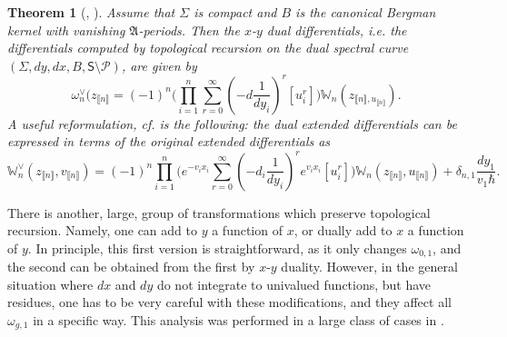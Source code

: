 \documentclass[10pt,a4paper,oneside,no-math,reqno]{amsart}%
\theoremstyle{plain}
\newtheorem{theorem}{Theorem}[section]
\theoremstyle{definition}
\theoremstyle{remark}
\numberwithin{equation}{section}
\newcommand{\mb}[1]{\mathbb{#1}}
\newcommand{\mf}[1]{\mathfrak{#1}}
\newcommand{\mc}[1]{\mathcal{#1}}
\newcommand{\1}{\mathds{1}}
\newcommand{\<}{\langle}
\renewcommand{\>}{\rangle}
\begin{document}
\begin{theorem}[{\cite[Theorem 1.14]{ABDKS25universal}, \cite[Theorem 3.6]{ABDKS25}}]\label{Thmx-y}
    Assume that $ \Sigma $ is compact and $ B $ is the canonical Bergman kernel with vanishing $ \mf{A}$-periods. Then the \emph{$ x$-$y$ dual differentials}, i.e. the differentials computed by topological recursion on the \emph{dual} spectral curve $ (\Sigma, dy, dx, B, \mathsf{S} \setminus \mc{P})$, are given by
    \begin{equation}\label{NonExtendedx-y}
        \omega^\vee_{n} (z_{\llbracket n \rrbracket}
        =
        (-1)^n \Bigg( \prod_{i=1}^n \sum_{r = 0}^\infty ( - d\frac{1}{dy_i})^r [u_i^r] \Bigg) \mb{W}_n (z_{\llbracket n \rrbracket, u_{\llbracket n \rrbracket }}).
    \end{equation}
    A useful reformulation, cf. \cite[Theorem 3.10.3]{ABDKS24} is the following: the dual extended differentials can be expressed in terms of the original extended differentials as
    \begin{equation}\label{Extendedx-y}
        \mb{W}^\vee_n (z_{\llbracket n \rrbracket}, v_{\llbracket n \rrbracket})
        =
        (-1)^n \prod_{i=1}^n \Big( e^{-v_i x_i} \sum_{r=0}^\infty (- d_i \frac{1}{dy_i} )^r e^{v_i x_i} [u_i^r] \Big) \mb{W}_n (z_{\llbracket n \rrbracket}, u_{\llbracket n \rrbracket}) + \delta_{n,1} \frac{dy_1}{v_1 \hbar}.
    \end{equation}
\end{theorem}

There is another, large, group of transformations which preserve topological recursion. Namely, one can add to $ y $ a function of $x$, or dually add to $ x$ a function of $y$. In principle, this first version is straightforward, as it only changes $ \omega_{0,1}$, and the second can be obtained from the first by $ x$-$y$ duality. However, in the general situation where $ dx$ and $ dy$ do not integrate to univalued functions, but have residues, one has to be very careful with these modifications, and they affect all $ \omega_{g,1}$ in a specific way. This analysis was performed in a large class of cases in \cite{ABDKS24}.
\end{document}
